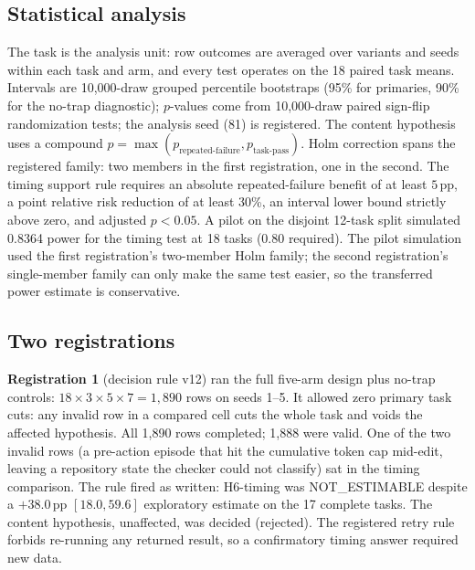 \documentclass[11pt]{article}
\newcommand{\pp}{\ensuremath{\,\mathrm{pp}}}
\begin{document}
\subsection{Statistical analysis}
\label{sec:stats}

The task is the analysis unit: row outcomes are averaged over variants and
seeds within each task and arm, and every test operates on the 18 paired
task means. Intervals are 10{,}000-draw grouped percentile bootstraps (95\%
for primaries, 90\% for the no-trap diagnostic); $p$-values come from
10{,}000-draw paired sign-flip randomization tests; the analysis seed (81)
is registered. The content hypothesis uses a compound
$p = \max(p_{\text{repeated-failure}}, p_{\text{task-pass}})$. Holm
correction spans the registered family: two members in the first
registration, one in the second. The timing support rule requires an
absolute repeated-failure benefit of at least $5\pp$, a point relative risk
reduction of at least 30\%, an interval lower bound strictly above zero, and
adjusted $p < 0.05$. A pilot on the disjoint 12-task split simulated 0.8364
power for the timing test at 18 tasks (0.80 required). The pilot simulation
used the first registration's two-member Holm family; the second
registration's single-member family can only make the same test easier, so
the transferred power estimate is conservative.

\subsection{Two registrations}
\label{sec:registrations}

\textbf{Registration 1} (decision rule v12) ran the full five-arm design plus
no-trap controls: $18 \times 3 \times 5 \times 7 = 1{,}890$ rows on seeds
1--5. It allowed zero primary task cuts: any invalid row in a compared cell
cuts the whole task and voids the affected hypothesis. All 1,890 rows
completed; 1,888 were valid. One of the two invalid rows (a pre-action
episode that hit the cumulative token cap mid-edit, leaving a repository
state the checker could not classify) sat in the timing comparison. The rule
fired as written: H6-timing was NOT\_ESTIMABLE despite a $+38.0\pp$
$[18.0, 59.6]$ exploratory estimate on the 17 complete tasks. The content
hypothesis, unaffected, was decided (rejected). The registered retry rule
forbids re-running any returned result, so a confirmatory timing answer
required new data.
\end{document}
